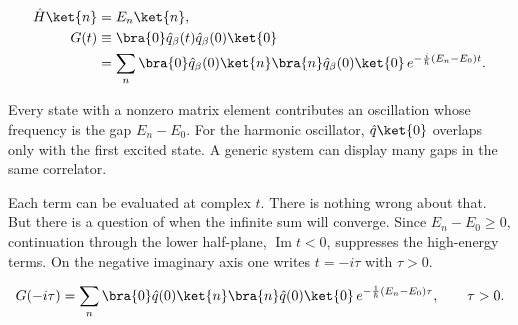 \begin{align}
  \hat H\ket{n}&=E_n\ket{n},
  \label{eq:proposal-energy-eigenstates}\\
  G(t)
  &\equiv\bra{0}\hat q_\beta(t)\hat q_\beta(0)\ket{0}
  \nonumber\\
  &=\sum_n
  \bra{0}\hat q_\beta(0)\ket{n}
  \bra{n}\hat q_\beta(0)\ket{0}\,
  e^{-\frac{i}{\hbar}(E_n-E_0)t}.
  \label{eq:proposal-spectral-correlator}
\end{align}

Every state with a nonzero matrix element contributes an oscillation whose
frequency is the gap $E_n-E_0$.  For the harmonic oscillator,
$\hat q\ket{0}$ overlaps only with the first excited state.  A generic system
can display many gaps in the same correlator.

Each term can be evaluated at complex $t$.  There is nothing wrong about that.
But there is a question of when the infinite sum will converge.  Since
$E_n-E_0\geq0$, continuation through the lower half-plane,
$\operatorname{Im}t<0$, suppresses the high-energy terms.  On the negative
imaginary axis one writes $t=-i\tau$ with $\tau>0$.

\begin{equation}
  G(-i\tau)
  =\sum_n
  \bra{0}\hat q(0)\ket{n}
  \bra{n}\hat q(0)\ket{0}\,
  e^{-\frac{1}{\hbar}(E_n-E_0)\tau},
  \qquad \tau>0.
  \label{eq:proposal-euclidean-spectral-correlator}
\end{equation}


